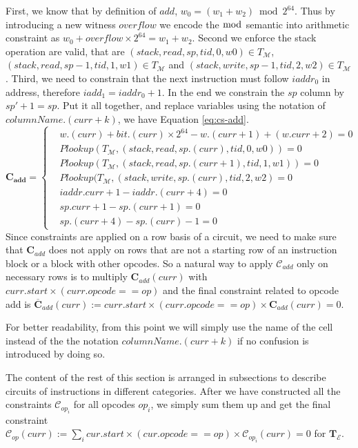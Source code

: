 First, we know that by definition of $add$, $w_0 = (w_1+w_2) \bmod 2^{64}$. Thus by introducing a new witness $overflow$ we encode the $\bmod$ semantic into arithmetic constraint as $w_0 + overflow \times 2^{64}= w_1 + w_2$. Second we enforce the stack operation are valid, that are $(stack, read, sp, tid, 0, w0) \in T_\mathcal{M}$, $(stack, read, sp-1, tid, 1, w1) \in T_\mathcal{M}$ and $(stack, write, sp-1, tid, 2, w2) \in T_\mathcal{M}$. Third, we need to constrain that the next instruction must follow $iaddr_0$ in address, therefore $iadd_1 = iaddr_0 + 1$. In the end we constrain the $sp$ column by $sp' + 1= sp$. Put it all together, and replace variables using the notation of $columnName.(curr + k)$, we have Equation \ref{eq:cs-add}.
\begin{equation}
    \mathbf{C_{add}} = \begin{cases}
        &w.(curr) + bit.(curr) \times 2^{64} - w.(curr+1) + (w.curr + 2) = 0 \\
        &Plookup(T_\mathcal{M}, (stack, read, sp.(curr), tid, 0, w0)) = 0 \\
        &Plookup(T_\mathcal{M}, (stack, read, sp.(curr+1), tid, 1, w1)) = 0 \\
        &Plookup(T_\mathcal{M}, (stack, write, sp.(curr), tid, 2, w2) = 0 \\
        &iaddr.curr + 1 - iaddr.(curr + 4) = 0\\
        &sp.curr + 1 - sp.(curr+1) = 0\\
        &sp.(curr+4) - sp.(curr) - 1 = 0
    \end{cases}
    \label{eq:cs-add}
\end{equation}
Since constraints are applied on a row basis of a circuit, we need to make sure that $\mathbf{C}_{add}$ does not apply on rows that are not a starting row of an instruction block or a block with other opcodes. So a natural way to apply $\mathcal{C}_{add}$ only on necessary rows is to multiply $\mathbf{C}_{add}(curr)$ with $curr.start \times (curr.opcode == op)$ and the final constraint related to opcode add is $\overline{\mathbf{C}}_{add}(curr) := curr.start \times (curr.opcode == op) \times \mathbf{C}_{add}(curr) = 0$. 

\begin{remark}
For better readability, from this point we will simply use the name of the cell instead of the the notation $columnName.(curr + k)$ if no confusion is introduced by doing so.
\end{remark}

\noindent The content of the rest of this section is arranged in subsections to describe circuits of instructions in different categories. After we have constructed all the constraints $\mathcal{C}_{op_i}$ for all opcodes $op_i$, we simply sum them up and get the final constraint $\mathcal{C}_{op}(curr) := \sum_i cur.start \times (cur.opcode == op) \times \mathcal{C}_{op_i}(curr) = 0$ for $\mathbf{T}_\mathcal{E}$.


